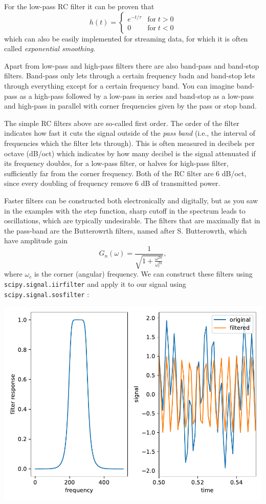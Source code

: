 \documentclass{article}
\newcommand{\ls}[1]{\lstinline{#1}}
\begin{document}
For the low-pass RC filter it can be proven that
\begin{equation}
    h(t) = \left\{\begin{matrix}
        e^{-t/\tau} & \mathrm{for}\; t > 0 \\
        0 & \mathrm{for}\; t < 0
    \end{matrix}\right.
\end{equation}
which can also be easily implemented for streaming data, for which it is often called \emph{exponential smoothing}.

Apart from low-pass and high-pass filters there are also band-pass and band-stop filters. Band-pass only lets through a certain frequency badn and band-stop lets through everything except for a certain frequency band. You can imagine band-pass as a high-pass followed by a low-pass in series and band-stop as a low-pass and high-pass in parallel with corner frequencies given by the pass or stop band. 

The simple RC filters above are so-called first order. The order of the filter indicates how fast it cuts the signal outside of the \emph{pass band} (i.e., the interval of frequencies which the filter lets through). This is often measured in decibels per octave (dB/oct) which indicates by how many decibel is the signal attenuated if its frequency doubles, for a low-pass filter, or halves for high-pass filter, sufficiently far from the corner frequency. Both of the RC filter are 6 dB/oct, since every doubling of frequency remove 6 dB of transmitted power.

Faster filters can be constructed both electronically and digitally, but as you saw in the examples with the step function, sharp cutoff in the spectrum leads to oscillations, which are typically undesirable. The filters that are maximally flat in the pass-band are the Butterowrth filters, named after S. Butterowrth, which have amplitude gain
\begin{equation*}
    G_n(\omega) = \frac{1}{\sqrt{1 + \frac{\omega^{2n}}{\omega_c^{2n}}}},
\end{equation*}
where $\omega_c$ is the corner (angular) frequency. We can construct these filters using \ls{scipy.signal.iirfilter} and apply it to our signal using \ls{scipy.signal.sosfilter}
:
\begin{center}
    \includegraphics[width=0.5\linewidth]{butter.pdf}
\end{center}
\end{document}
